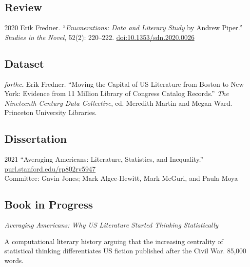 \documentclass[12pt,letterpaper]{report}
\begin{document}
\subsection*{Review}

\begin{tablist}
	\item[2020] \tab{}Erik Fredner. \enquote{\emph{Enumerations: Data and Literary Study} by Andrew Piper.} \textit{Studies in the Novel}, 52(2): 220--222. \href{https://doi.org/10.1353/sdn.2020.0026}{doi:10.1353/sdn.2020.0026}
\end{tablist}

\subsection*{Dataset}

\begin{tablist}
	\item[\emph{forthc.}] \tab{}Erik Fredner. \enquote{Moving the Capital of US Literature from Boston to New York: Evidence from 11 Million Library of Congress Catalog Records.} \emph{The Nineteenth-Century Data Collective}, ed. Meredith Martin and Megan Ward. Princeton University Libraries.
\end{tablist}

\subsection*{Dissertation}

\begin{tablist}
	\item[2021] \tab{}\enquote{Averaging Americans: Literature, Statistics, and Inequality.} \href{https://purl.stanford.edu/rp802rv5947}{purl.stanford.edu/rp802rv5947}\\
	Committee: Gavin Jones; Mark Algee-Hewitt, Mark McGurl, and Paula Moya
\end{tablist}

\subsection*{Book in Progress}

\textit{Averaging Americans: Why US Literature Started Thinking Statistically}

\begin{adjustwidth}{2em}{}A computational literary history arguing that the increasing centrality of statistical thinking differentiates US fiction published after the Civil War. 85,000 words.
\end{adjustwidth}
\end{document}
